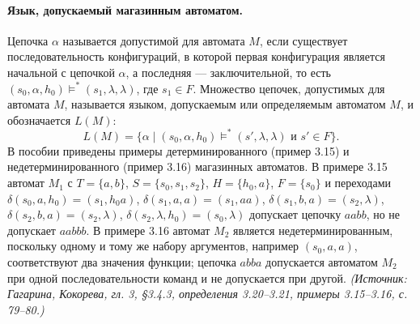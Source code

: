 \documentclass[a4paper,12pt]{article}
\begin{document}
\paragraph{Язык, допускаемый магазинным автоматом.}
Цепочка \(\alpha\) называется допустимой для автомата \(M\), если существует последовательность конфигураций, в которой первая конфигурация является начальной с цепочкой \(\alpha\), а последняя — заключительной, то есть \((s_0,\alpha,h_0)\models^*(s_1,\lambda,\lambda)\), где \(s_1\in F\). Множество цепочек, допустимых для автомата \(M\), называется языком, допускаемым или определяемым автоматом \(M\), и обозначается \(L(M)\):
\[
L(M)=\{\alpha\mid(s_0,\alpha,h_0)\models^*(s',\lambda,\lambda)\text{ и }s'\in F\}.
\]
В пособии приведены примеры детерминированного (пример 3.15) и недетерминированного (пример 3.16) магазинных автоматов. В примере 3.15 автомат \(M_1\) с \(T=\{a,b\}\), \(S=\{s_0,s_1,s_2\}\), \(H=\{h_0,a\}\), \(F=\{s_0\}\) и переходами \(\delta(s_0,a,h_0)=(s_1,h_0a)\), \(\delta(s_1,a,a)=(s_1,aa)\), \(\delta(s_1,b,a)=(s_2,\lambda)\), \(\delta(s_2,b,a)=(s_2,\lambda)\), \(\delta(s_2,\lambda,h_0)=(s_0,\lambda)\) допускает цепочку \(aabb\), но не допускает \(aabbb\). В примере 3.16 автомат \(M_2\) является недетерминированным, поскольку одному и тому же набору аргументов, например \((s_0,a,a)\), соответствуют два значения функции; цепочка \(abba\) допускается автоматом \(M_2\) при одной последовательности команд и не допускается при другой.
\textit{(Источник: Гагарина, Кокорева, гл. 3, §3.4.3, определения 3.20--3.21, примеры 3.15--3.16, с. 79--80.)}
\end{document}
